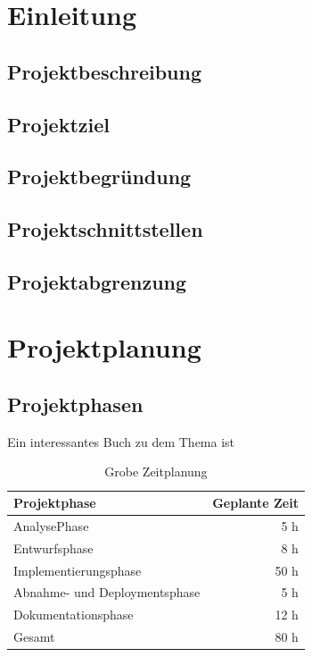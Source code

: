 \documentclass[12pt, ngerman, a4paper,toc=left, parskip=half, numbers=noenddot, headings=standardclasses, nonumberlist]{scrartcl}
\begin{document}
\newpage
\cleardoublepage{}
{}
\listoftables

\newpage
{}
\renewcommand{\thepage}{\arabic{page}}

\section{Einleitung}

\subsection{Projektbeschreibung}

\subsection{Projektziel}

\subsection{Projektbegründung}

\subsection{Projektschnittstellen}

\subsection{Projektabgrenzung}

\newpage
\section{Projektplanung}

\subsection{Projektphasen}
Ein interessantes Buch zu dem Thema ist \cite{IOR2021}

\begin{table}[h]
	\begin{center}
		\begin{tabular}{l r}
			\rowcolor{blue!20}
			Projektphase 				  & Geplante Zeit \\
			\midrule
			AnalysePhase 			      &  5 h          \\
			Entwurfsphase   		      &  8 h          \\
			Implementierungsphase         & 50 h          \\
			Abnahme- und Deploymentsphase &  5 h		  \\
			Dokumentationsphase			  & 12 h		  \\
			\midrule
			Gesamt						  & 80 h		  \\
		\end{tabular}
	\end{center}
	\caption{Grobe Zeitplanung}
	\label{table:1}
\end{table}
\end{document}

